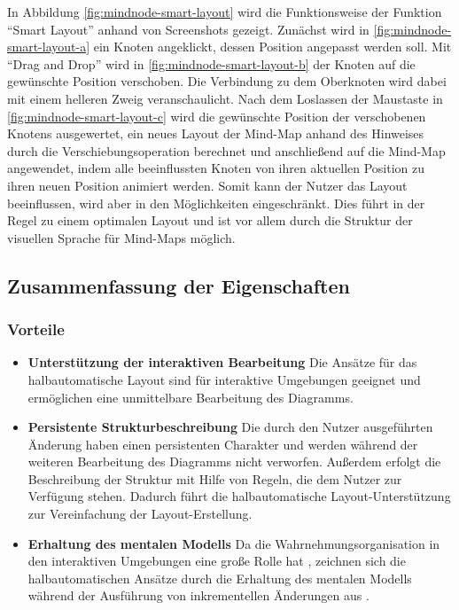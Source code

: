 In Abbildung \ref{fig:mindnode-smart-layout} wird die Funktionsweise der Funktion \enquote{Smart Layout} anhand von Screenshots gezeigt. Zunächst wird in \ref{fig:mindnode-smart-layout-a} ein Knoten angeklickt, dessen Position angepasst werden soll. Mit \enquote{Drag and Drop} wird in \ref{fig:mindnode-smart-layout-b} der Knoten auf die gewünschte Position verschoben. Die Verbindung zu dem Oberknoten wird dabei mit einem helleren Zweig veranschaulicht. Nach dem Loslassen der Maustaste in \ref{fig:mindnode-smart-layout-c} wird die gewünschte Position der verschobenen Knotens ausgewertet, ein neues Layout der Mind-Map anhand des Hinweises durch die Verschiebungsoperation berechnet und anschließend auf die Mind-Map angewendet, indem alle beeinflussten Knoten von ihren aktuellen Position zu ihren neuen Position animiert werden. Somit kann der Nutzer das Layout beeinflussen, wird aber in den Möglichkeiten eingeschränkt. Dies führt in der Regel zu einem optimalen Layout und ist vor allem durch die Struktur der visuellen Sprache für Mind-Maps möglich.


\subsection{Zusammenfassung der Eigenschaften}

\subsubsection{Vorteile}

\begin{itemize}

\item
\textbf{Unterstützung der interaktiven Bearbeitung}
Die Ansätze für das halbautomatische Layout sind für interaktive Umgebungen geeignet und ermöglichen eine unmittelbare Bearbeitung des Diagramms.

\item
\textbf{Persistente Strukturbeschreibung}
Die durch den Nutzer ausgeführten Änderung haben einen persistenten Charakter und werden während der weiteren Bearbeitung des Diagramms nicht verworfen. Außerdem erfolgt die Beschreibung der Struktur mit Hilfe von Regeln, die dem Nutzer zur Verfügung stehen. Dadurch führt die halbautomatische Layout-Unterstützung zur Vereinfachung der Layout-Erstellung.

\item
\textbf{Erhaltung des mentalen Modells}
Da die Wahrnehmungsorganisation in den interaktiven Umgebungen eine große Rolle hat \cite{ShieberKosak93Automating, Maier12A-Pattern-based}, zeichnen sich die halbautomatischen Ansätze durch die Erhaltung des mentalen Modells während der Ausführung von inkrementellen Änderungen aus \cite{GladischSchumann14Semi-Automatic}.

\end{itemize}

